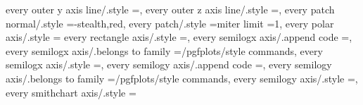 {{{{{{{{{{{{every outer y axis line/.style                                     ={},                                                                                                                                
every outer z axis line/.style                                     ={},                                                                                                                                
every patch normal/.style                                          ={-stealth,red},                                                                                                                    
every patch/.style                                                 ={miter limit                                                                                                                       =1},                                                       
every polar axis/.style                                            ={                                                                                                                                  
every rectangle axis/.style                                        ={},                                                                                                                                
every semilogx axis/.append code                                   ={},                                                                        
every semilogx axis/.belongs to family                             =/pgfplots/style commands,                                                                                                          
every semilogx axis/.style                                         ={},                                                                                                                                
every semilogy axis/.append code                                   ={},                                                                        
every semilogy axis/.belongs to family                             =/pgfplots/style commands,                                                                                                          
every semilogy axis/.style                                         ={},                                                                                                                                
every smithchart axis/.style                                       ={                                                                                                                                  
}}}}}}}}}}}}}}
